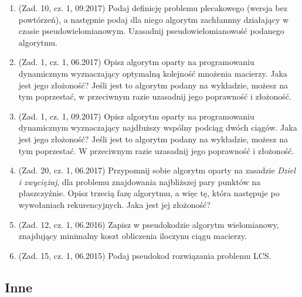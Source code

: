 \documentclass[10pt]{article}%
\begin{document}
\begin{enumerate}

\item(Zad. 10, cz. 1, 09.2017) Podaj definicję problemu plecakowego (wersja bez powtórzeń), a następnie podaj dla niego algorytm zachłannny działający w czasie pseudowielomianowym. Uzasadnij pseudowielomianowość podanego algorytmu.

\item(Zad. 1, cz. 1, 06.2017)
Opisz algorytm oparty na programowaniu dynamicznym wyznaczający optymalną kolejność mnożenia macierzy. Jaka jest jego złożoność? Jeśli jest to algorytm podany na wykładzie, możesz na tym poprzestać, w przeciwnym razie uzasadnij jego poprawność i złożoność.

\item (Zad. 1, cz. 1, 09.2017) 
Opisz algorytm oparty na programowaniu dynamicznym wyznaczający najdłuższy wspólny podciąg dwóch ciągów. Jaka jest jego złożoność? Jeśli jest to algorytm podany na wykładzie, możesz na tym poprzestać. W przeciwnym razie uzasadnij jego poprawność i złożoność.

\item (Zad. 20, cz. 1, 06.2017) Przypomnij sobie algorytm oparty na zasadzie \emph{Dziel i zwyciężaj}, dla problemu znajdowania najbliższej pary punktów na płaszczyźnie. Opisz trzecią fazę algorytmu, a więc tę, która następuje po wywołaniach rekurencyjnych. Jaka jest jej złożoność?

\item (Zad. 12, cz. 1, 06.2016) Zapisz w pseudokodzie algorytm wielomianowy, znajdujący minimalny koszt obliczenia iloczynu ciągu macierzy.

\item (Zad. 15, cz. 1, 06.2015) Podaj pseudokod rozwiązania problemu LCS.

\end{enumerate}

\subsection{Inne}
\end{document}

